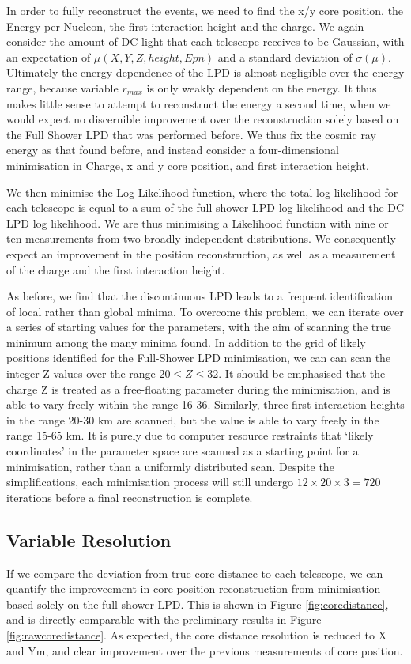 \documentclass[11pt]{article}
\begin{document}
In order to fully reconstruct the events, we need to find the x/y core position, the Energy per Nucleon, the first interaction height and the charge. We again consider the amount of DC light that each telescope receives to be Gaussian, with an expectation of $\mu(X, Y, Z, height, Epn)$ and a standard deviation of $\sigma(\mu)$. Ultimately the energy dependence of the LPD is almost negligible over the energy range, because variable $r_{max}$ is only weakly dependent on the energy. It thus makes little sense to attempt to reconstruct the energy a second time, when we would expect no discernible improvement over the reconstruction solely based on the Full Shower LPD that was performed before. We thus fix the cosmic ray energy as that found before, and instead consider a four-dimensional minimisation in Charge, x and y core position, and first interaction height.

We then minimise the Log Likelihood function, where the total log likelihood for each telescope is equal to a sum of the full-shower LPD log likelihood and the DC LPD log likelihood. We are thus minimising a Likelihood function with nine or ten measurements from two broadly independent distributions. We consequently expect an improvement in the position reconstruction, as well as a measurement of the charge and the first interaction height.

As before, we find that the discontinuous LPD leads to a frequent identification of local rather than global minima. To overcome this problem, we can iterate over a series of starting values for the parameters, with the aim of scanning the true minimum among the many minima found. In addition to the grid of likely positions identified for the Full-Shower LPD minimisation, we can can scan the integer Z values over the range $ 20 \leq Z \leq 32 $. It should be emphasised that the charge Z is treated as a free-floating parameter during the minimisation, and is able to vary freely within the range 16-36. Similarly, three first interaction heights in the range 20-30 km are scanned, but the value is able to vary freely in the range 15-65 km. It is purely due to computer resource restraints that \textquoteleft likely coordinates' in the parameter space are scanned as a starting point for a minimisation, rather than a uniformly distributed scan. Despite the simplifications, each minimisation process will still undergo $12 \times 20 \times 3 = 720$ iterations before a final reconstruction is complete. 

\subsection{Variable Resolution}
If we compare the deviation from true core distance to each telescope, we can quantify the improvcement in core position reconstruction from minimisation based solely on the full-shower LPD. This is shown in Figure \ref{fig:coredistance}, and is directly comparable with the preliminary results in Figure \ref{fig:rawcoredistance}. As expected, the core distance resolution is reduced to X and Ym, and clear improvement over the previous measurements of core position. 
\end{document}
